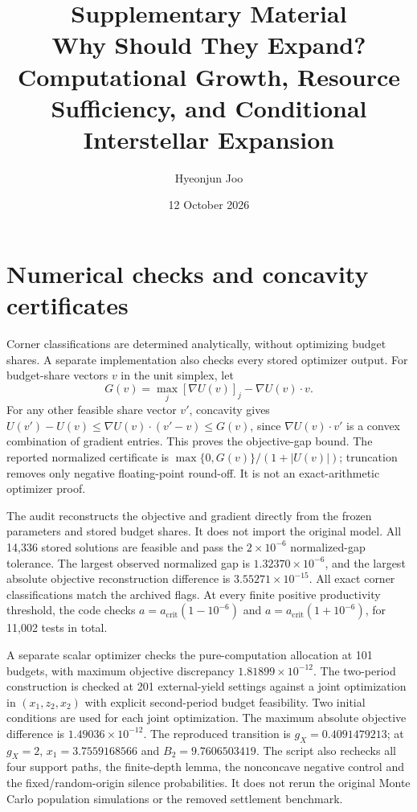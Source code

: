 \documentclass[11pt,a4paper]{article}
\title{Supplementary Material\\\large Why Should They Expand? Computational Growth, Resource Sufficiency, and Conditional Interstellar Expansion}
\author{Hyeonjun Joo}
\date{12 October 2026}
\begin{document}
\maketitle
\section{Numerical checks and concavity certificates}
Corner classifications are determined analytically, without optimizing
budget shares. A separate implementation also checks every stored
optimizer output. For budget-share vectors $v$ in the unit simplex, let
\[
 G(v)=\max_j[\nabla U(v)]_j-\nabla U(v)\cdot v.
\]
For any other feasible share vector $v'$, concavity gives
$U(v')-U(v)\leq\nabla U(v)\cdot(v'-v)\leq G(v)$, since
$\nabla U(v)\cdot v'$ is a convex combination of gradient entries.
This proves the objective-gap bound. The reported normalized certificate
is $\max\{0,G(v)\}/(1+|U(v)|)$; truncation removes only negative
floating-point round-off. It is not an exact-arithmetic optimizer proof.

The audit reconstructs the objective and gradient directly from the
frozen parameters and stored budget shares. It does not import the
original model. All 14,336 stored solutions are feasible and pass the
$2\times10^{-6}$ normalized-gap tolerance. The largest observed
normalized gap is $1.32370\times10^{-6}$, and the largest absolute objective
reconstruction difference is $3.55271\times10^{-15}$.
All exact corner classifications match the archived flags. At every
finite positive productivity threshold, the code checks
$a=a_{\mathrm{crit}}(1-10^{-6})$ and
$a=a_{\mathrm{crit}}(1+10^{-6})$, for 11,002 tests in total.

A separate scalar optimizer checks the pure-computation allocation at
101 budgets, with maximum objective discrepancy
$1.81899\times10^{-12}$. The two-period construction is checked at
201 external-yield settings against a joint optimization
in $(x_1,z_2,x_2)$ with explicit second-period budget feasibility.
Two initial conditions are used for each joint optimization.
The maximum absolute objective difference is $1.49036\times10^{-12}$.
The reproduced transition is $g_X=0.4091479213$; at $g_X=2$,
$x_1=3.7559168566$ and $B_2=9.7606503419$.
The script also rechecks all four support paths, the finite-depth lemma,
the nonconcave negative control and the fixed/random-origin silence
probabilities. It does not rerun the original Monte Carlo population
simulations or the removed settlement benchmark.
\end{document}
